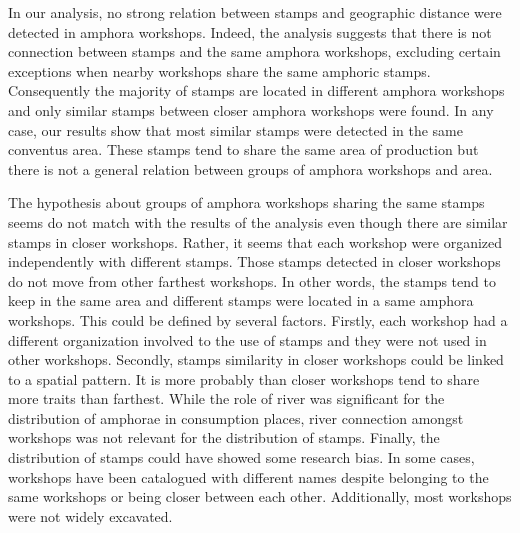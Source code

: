 \documentclass[review]{elsarticle}
\begin{document}
In our analysis, no strong relation between stamps and geographic distance were detected in amphora workshops. Indeed, the analysis suggests that there is not connection between stamps and the same amphora workshops, excluding certain exceptions when nearby workshops share the same amphoric stamps. Consequently the majority of stamps are located in different amphora workshops and only similar stamps between closer amphora workshops were found. In any case, our results show that most similar stamps were detected in the same conventus area. These stamps tend to share the same area of production but there is not a general relation between groups of amphora workshops and area. 

The hypothesis about groups of amphora workshops sharing the same stamps seems do not match with the results of the analysis even though there are similar stamps in closer workshops. Rather, it seems that each workshop were organized independently with different stamps. Those stamps detected in closer workshops do not move from other farthest workshops. In other words, the stamps tend to keep in the same area and different stamps were located in a same amphora workshops. 
This could be defined by several factors. Firstly, each workshop had a different organization involved to the use of stamps and they were not used in other workshops. Secondly, stamps similarity in closer workshops could be linked to a spatial pattern. It is more probably than closer workshops tend to share more traits than farthest. While the role of river was significant for the distribution of amphorae in consumption places, river connection amongst workshops was not relevant for the distribution of stamps. Finally, the distribution of stamps could have showed some research bias. In some cases, workshops have been catalogued with different names despite belonging to the same workshops or being closer between each other. Additionally, most workshops were not widely excavated. 

\end{document}
